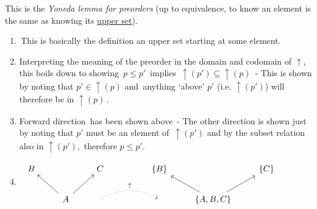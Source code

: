 This is the \emph{Yoneda lemma for preorders} (up to equivalence, to know an element is the same as knowing its \href{doc/1 math/Seven Sketches in Compositionality/1 Generative Effects/3 Preorders/Upper set}{upper set}).
  \begin{enumerate}
    \item \,This is basically the definition an upper set starting at some element.\,
    \item Interpreting the meaning of the preorder in the domain and codomain of $\uparrow$, this boils down to showing \,$p \leq p'$\, implies \,$\uparrow(p') \subseteq \uparrow(p)$\,
          - This is shown by noting that $p' \in \uparrow(p)$ and \,anything `above' $p'$ (i.e. $\uparrow(p')$) will therefore be in $\uparrow(p)$\,.
    \item Forward direction \,has been shown above\,
          - The other direction is shown just by noting that $p\prime$ must be an element of \,$\uparrow(p\prime)$ and by the subset relation also in $\uparrow(p')$,\, therefore $p \leq p'$.
    \item \, $\begin{tikzcd}
              B & & C &  & \{B\} & & \{C\} \\
              & A \arrow[lu] \arrow[ru] & {} \arrow[rr, "\uparrow", dotted, bend left] &  & {}    & \{A, B, C\} \arrow[ru] \arrow[lu] &
            \end{tikzcd}$
        \,
  \end{enumerate}